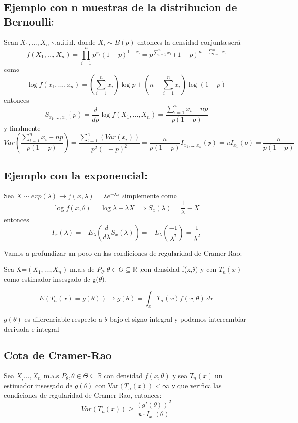 \subsection*{Ejemplo con n muestras de la distribucion de Bernoulli:}

Sean $X_1,\dots,X_n$ v.a.i.i.d. donde $X_i \sim B(p)$ entonces la densidad conjunta será
\[
    f(X_1,\dots,X_n)=\prod_{i=1}^{n} p^{x_i}(1-p)^{1-x_i}=p^{\sum_{i=1}^{n} x_i}(1-p)^{n-\sum_{i=1}^{n} x_i}
\]
como
\[
    \log f(x_1,...,x_n)=(\sum_{i=1}^{n}x_i) \log p + (n-\sum_{i=1}^{n}x_i) \log (1-p)
\]
entonces
\[
    S_{x_1,...,x_n}(p)=\frac{d}{dp} \log f(X_1,...,X_n)=\frac{\sum_{i=1}^{n}x_i - np}{p(1-p)}
\]
y finalmente
\[
    Var\left(\frac{\sum_{i=1}^{n}x_i - np}{p(1-p)}\right)=\frac{\sum_{i=1}^{n}(Var (x_i))}{p^2(1-p)^2}=\frac{n}{p(1-p)}I_{x_1,...,x_n}(p)=n  I_{x_1}(p)=\frac{n}{p(1-p)}
\]

\newpage

\subsection*{Ejemplo con la exponencial:}

Sea $X \sim exp(\lambda) \to f(x,\lambda)=\lambda e^{-\lambda x}$
simplemente como
\[
    \log f(x,\theta)=\log \lambda - \lambda X \implies S_x(\lambda)=\frac{1}{\lambda}-X
\]
entonces
\[
    I_x (\lambda)=-E_\lambda\left(\frac{d}{d \lambda} S_x(\lambda)\right)=-E_\lambda\left(\frac{-1}{\lambda^2}\right)=\frac{1}{\lambda^2}
\]

\noindent Vamos a profundizar un poco en las condiciones de regularidad de Cramer-Rao:

Sea X=$(X_1,\dots,X_n)$ m.a.s de $P_\theta,\theta \in \Theta \subseteq \mathbb{R}$
,con densidad f(x,$\theta)$ y con $T_n(x)$ como estimador insesgado de g($\theta$).

\[
    E(T_n(x)=g(\theta)) \to g(\theta)=\int_x T_n(x) f(x,\theta) \,dx
\]

$g(\theta)$ es diferenciable respecto a $\theta$ bajo el signo integral y podemos intercambiar derivada e integral

\subsection{Cota de Cramer-Rao}
Sea $X_,\dots,X_n$ m.a.s $P_\theta,\theta \in \Theta \subseteq \mathbb{R}$ con densidad
$f(x,\theta)$ y sea $T_n(x)$ un estimador insesgado de $g(\theta)$ con Var$(T_n(x)) < \infty$
y que verifica las condiciones de regularidad de Cramer-Rao, entonces:
\[
    Var(T_n(x)) \geq \frac{(g'(\theta))^2}{n \cdot I_{x_1}(\theta)}
\]

